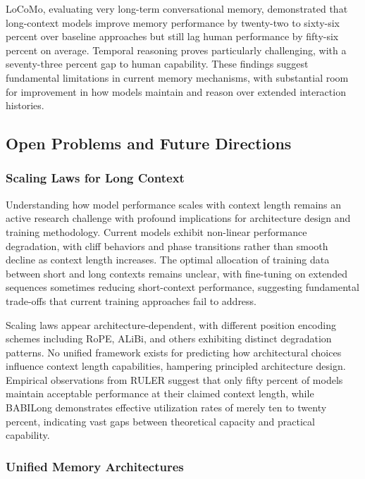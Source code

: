 \documentclass[11pt,letterpaper]{article}
\begin{document}
LoCoMo, evaluating very long-term conversational memory, demonstrated that long-context models improve memory performance by twenty-two to sixty-six percent over baseline approaches but still lag human performance by fifty-six percent on average. Temporal reasoning proves particularly challenging, with a seventy-three percent gap to human capability. These findings suggest fundamental limitations in current memory mechanisms, with substantial room for improvement in how models maintain and reason over extended interaction histories.

\subsection{Open Problems and Future Directions}

\subsubsection{Scaling Laws for Long Context}

Understanding how model performance scales with context length remains an active research challenge with profound implications for architecture design and training methodology. Current models exhibit non-linear performance degradation, with cliff behaviors and phase transitions rather than smooth decline as context length increases. The optimal allocation of training data between short and long contexts remains unclear, with fine-tuning on extended sequences sometimes reducing short-context performance, suggesting fundamental trade-offs that current training approaches fail to address.

Scaling laws appear architecture-dependent, with different position encoding schemes including RoPE, ALiBi, and others exhibiting distinct degradation patterns. No unified framework exists for predicting how architectural choices influence context length capabilities, hampering principled architecture design. Empirical observations from RULER suggest that only fifty percent of models maintain acceptable performance at their claimed context length, while BABILong demonstrates effective utilization rates of merely ten to twenty percent, indicating vast gaps between theoretical capacity and practical capability.

\subsubsection{Unified Memory Architectures}
\end{document}
